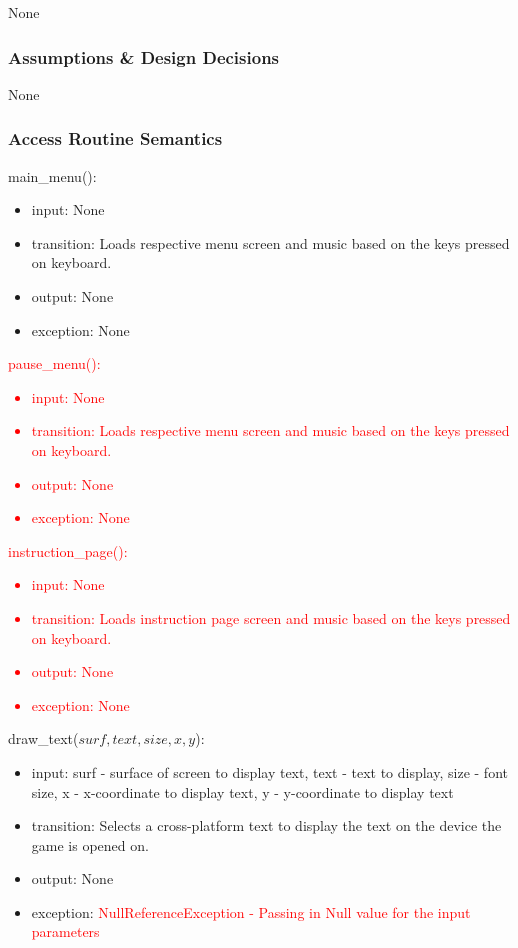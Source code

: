 \documentclass[12pt, titlepage]{article}
\begin{document}
None

\subsubsection* {Assumptions \& Design Decisions}

None

\subsubsection* {Access Routine Semantics}

main\_menu():
\begin{itemize}
\item input: None
\item transition: Loads respective menu screen and music based on the keys pressed on keyboard. 
\item output: None
\item exception: None
\end{itemize}

\noindent \textcolor{red}{pause\_menu():
\begin{itemize}
\item input: None
\item transition: Loads respective menu screen and music based on the keys pressed on keyboard. 
\item output: None
\item exception: None
\end{itemize}}

\noindent \textcolor{red}{instruction\_page():
\begin{itemize}
\item input: None
\item transition: Loads instruction page screen and music based on the keys pressed on keyboard. 
\item output: None
\item exception: None
\end{itemize}}

\noindent draw\_text($surf, text, size, x, y$):
\begin{itemize}
\item input: surf - surface of screen to display text, text - text to display, size - font size, x - x-coordinate to display text, y - y-coordinate to display text
\item transition: Selects a cross-platform text to display the text on the device the game is opened on.
\item output: None
\item exception: \textcolor{red}{NullReferenceException - Passing in Null value for the input parameters}
\end{itemize}
\end{document}
